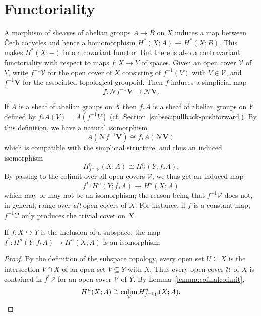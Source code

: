 \documentclass[a4paper,openany]{scrbook}
\newcommand{\nerve}{\mathcal N}
\begin{document}
\section{Functoriality}

A morphism of sheaves of abelian groups $A \to B$ on $X$ induces a map between \v Cech cocycles and hence a homomorphism $H^*(X;A) \to H^*(X;B)$. This makes $H^*(X;-)$ into a covariant functor. But there is also a contravariant functoriality with respect to maps $f\colon X \to Y$ of spaces. Given an open cover $\mathcal V$ of $Y$, write $f^{-1}\mathcal V$ for the open cover of $X$ consisting of $f^{-1}(V)$ with $V \in \mathcal V$, and $f^{-1}\mathbf V$ for the associated topological groupoid. Then $f$ induces a simplicial map
\[
f\colon\nerve f^{-1}\mathbf V \to \nerve \mathbf V.
\]

If $A$ is a sheaf of abelian groups on $X$ then $f_*A$ is a sheaf of abelian groups on $Y$ defined by $f_*A(V) = A(f^{-1}V)$ (cf.\ Section~\ref{subsec:pullback-pushforward}). By this definition, we have a natural isomorphism
\[
A(\nerve f^{-1}\mathbf V) \cong f_*A(\nerve \mathbf V)
\]
which is compatible with the simplicial structure, and thus an induced isomorphism
\[
H_{f^{-1}\mathcal V}^n(X;A) \cong H_{\mathcal V}^n(Y;f_*A).
\]
By passing to the colimit over all open covers $\mathcal V$, we thus get an induced map
\begin{equation}\label{eq:inducedmaponcohomology}
f^*\colon H^n(Y;f_*A) \to H^n(X;A)
\end{equation}
which may or may not be an isomorphism; the reason being that $f^{-1}\mathcal V$ does not, in general, range over \emph{all} open covers of $X$. For instance, if $f$ is a constant map, $f^{-1}\mathcal V$ only produces the trivial cover on $X$.

\begin{lemma}\label{lemma:basechangeiso}
If $f\colon X \hookrightarrow Y$ is the inclusion of a subspace, the map $f^*\colon H^n(Y;f_*A) \to H^n(X;A)$ is an isomorphism.
\end{lemma}
\begin{proof}
By the definition of the subspace topology, every open set $U \subseteq X$ is the intersection $V \cap X$ of an open set $V \subseteq Y$ with $X$. Thus every open cover $\mathcal U$ of $X$ is contained in $f^*\mathcal V$ for an open cover $\mathcal V$ of $Y$. By Lemma~\ref{lemma:cofinalcolimit},
\[
H^n(X;A) \cong \colim_{\mathcal V}H^n_{f^{-1}\mathcal V}(X;A).
\]
\end{proof}
\end{document}
